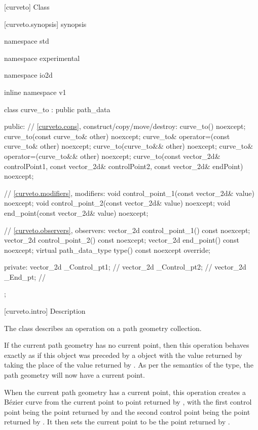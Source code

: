  [curveto] {Class }

 [curveto.synopsis] { synopsis}

\begin{codeblock}
namespace std { namespace experimental { namespace io2d { inline namespace v1 {
  class curve_to : public path_data {
  public:
    // \ref{curveto.cons}, construct/copy/move/destroy:
    curve_to() noexcept;
    curve_to(const curve_to& other) noexcept;
    curve_to& operator=(const curve_to& other) noexcept;
    curve_to(curve_to&& other) noexcept;
    curve_to& operator=(curve_to&& other) noexcept;
    curve_to(const vector_2d& controlPoint1, const vector_2d& controlPoint2,
      const vector_2d& endPoint) noexcept;

    // \ref{curveto.modifiers}, modifiers:
    void control_point_1(const vector_2d& value) noexcept;
    void control_point_2(const vector_2d& value) noexcept;
    void end_point(const vector_2d& value) noexcept;


    // \ref{curveto.observers}, observers:
    vector_2d control_point_1() const noexcept;
    vector_2d control_point_2() const noexcept;
    vector_2d end_point() const noexcept;
    virtual path_data_type type() const noexcept override;
    
  private:
    vector_2d _Control_pt1; // \expos
    vector_2d _Control_pt2; // \expos
    vector_2d _End_pt;      // \expos
  };
} } } }
\end{codeblock}

 [curveto.intro] { Description}

\pnum
{}
The class  describes an operation on a path geometry collection.

\pnum
If the current path geometry has no current point, then this operation behaves exactly as if this object was preceded by a  object with the value returned by  taking the place of the value returned by . As per the semantics of the  type, the path geometry will now have a current point.

\pnum
When the current path geometry has a current point, this operation creates a B\'ezier curve from the current point to point returned by , with the first control point being the point returned by  and the second control point being the point returned by . It then sets the current point to be the point returned by .

